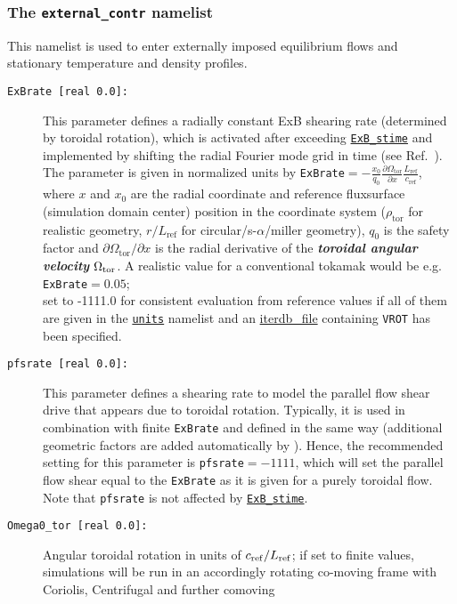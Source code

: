 \documentclass[12pt]{article}
\begin{document}
\subsubsection{The \texttt{external\_contr} namelist}
This namelist is used to enter externally imposed equilibrium flows and stationary temperature and density
profiles.
\begin{description}
\item[\hypertarget{ExBrate}{\tt ExBrate [real 0.0]:}] This parameter defines a radially constant ExB shearing rate
  (determined by toroidal rotation), which is activated after exceeding \hyperlink{ExB_stime}{\tt ExB\_stime} and implemented by shifting the radial Fourier mode grid in time (see Ref.~\cite{Hammett06}).
  The parameter is given in normalized units by
  \texttt{ExBrate}$=-\frac{x_0}{q_0}\frac{\partial\Omega_{\mathrm{tor}}}{\partial x}\frac{L_\mathrm{ref}}{c_\mathrm{ref}}$,
  where $x$ and \hyperlink{x0}{$x_0$} are the radial coordinate and reference fluxsurface (simulation domain center) position in the \gene coordinate system ($\rho_\mathrm{tor}$ for realistic geometry,
  $r/L_\mathrm{ref}$ for circular/s-$\alpha$/miller geometry), \hyperlink{q0}{$q_0$} is the safety factor and $\partial\Omega_{\mathrm{tor}}/\partial x$
  is the radial derivative of the
  {\bf\em toroidal angular velocity} $\Omega_{\rm tor}$. A realistic value for a conventional tokamak would be e.g. \texttt{ExBrate}$=0.05$;\\
  set to -1111.0 for consistent evaluation from reference values if all of them are given
  in the \hyperlink{units_nml}{\tt units} namelist and an \hyperlink{iterdb_file}{iterdb\_file} containing \texttt{VROT}
  has been specified.
\item[\hypertarget{pfsrate}{\tt pfsrate [real 0.0]:}] This parameter defines a shearing rate to model the parallel flow shear
  drive that appears due to toroidal rotation. Typically, it is used in combination with finite \texttt{ExBrate} and
  defined in the same way (additional geometric factors are added automatically by \gene).
  Hence, the recommended setting for this parameter is \texttt{pfsrate}$=-1111$, which will set the parallel flow shear
  equal to the \texttt{ExBrate} as it is given for a purely toroidal flow. Note that {\tt pfsrate} is not affected by \hyperlink{ExB_stime}{\tt ExB\_stime}.
\item[\hypertarget{Omega0_tor}{\tt Omega0\_tor [real 0.0]:}] Angular toroidal rotation in units of $c_{\rm ref}/L_{\rm ref}$; if set to finite values,
simulations will be run in an accordingly rotating co-moving frame with Coriolis, Centrifugal and further comoving

\end{description}
\end{document}
